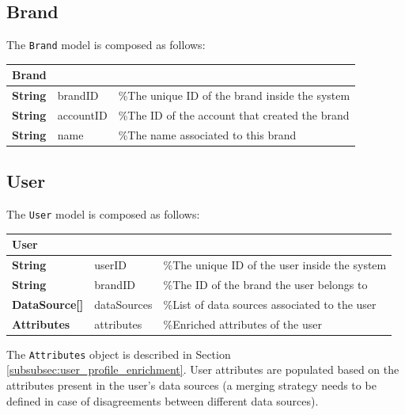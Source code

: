 \subsection{Brand}
The \texttt{Brand} model is composed as follows:
\begin{center}
\begin{tabular}{lll}
\hline
Brand & & \\
\hline
\textbf{String} & brandID & \%The unique ID of the brand inside the system \\
\textbf{String} & accountID & \%The ID of the account that created the brand \\
\textbf{String} & name & \%The name associated to this brand \\
\hline
\end{tabular}
\end{center}

\subsection{User}
The \texttt{User} model is composed as follows:
\begin{center}
\begin{tabular}{lll}
\hline
User & & \\
\hline
\textbf{String} & userID & \%The unique ID of the user inside the system \\
\textbf{String} & brandID & \%The ID of the brand the user belongs to \\
\textbf{DataSource[]} & dataSources & \%List of data sources associated to the user \\
\textbf{Attributes} & attributes & \%Enriched attributes of the user \\
\hline
\end{tabular}
\end{center}
The \texttt{Attributes} object is described in Section \ref{subsubsec:user_profile_enrichment}. User attributes are populated based on the attributes present in the user's data sources (a merging strategy needs to be defined in case of disagreements between different data sources). 

